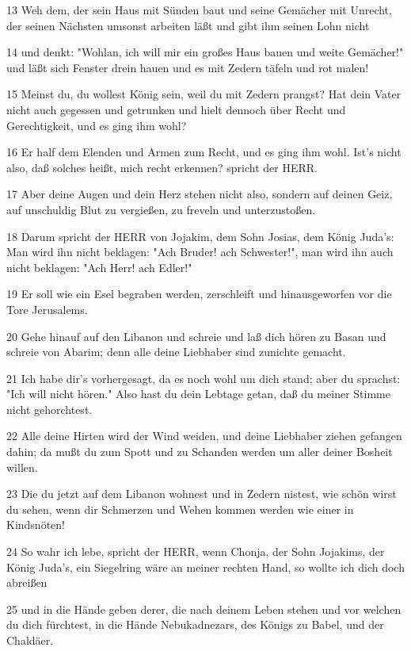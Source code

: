 \par 13 Weh dem, der sein Haus mit Sünden baut und seine Gemächer mit Unrecht, der seinen Nächsten umsonst arbeiten läßt und gibt ihm seinen Lohn nicht
\par 14 und denkt: "Wohlan, ich will mir ein großes Haus bauen und weite Gemächer!" und läßt sich Fenster drein hauen und es mit Zedern täfeln und rot malen!
\par 15 Meinst du, du wollest König sein, weil du mit Zedern prangst? Hat dein Vater nicht auch gegessen und getrunken und hielt dennoch über Recht und Gerechtigkeit, und es ging ihm wohl?
\par 16 Er half dem Elenden und Armen zum Recht, und es ging ihm wohl. Ist's nicht also, daß solches heißt, mich recht erkennen? spricht der HERR.
\par 17 Aber deine Augen und dein Herz stehen nicht also, sondern auf deinen Geiz, auf unschuldig Blut zu vergießen, zu freveln und unterzustoßen.
\par 18 Darum spricht der HERR von Jojakim, dem Sohn Josias, dem König Juda's: Man wird ihn nicht beklagen: "Ach Bruder! ach Schwester!", man wird ihn auch nicht beklagen: "Ach Herr! ach Edler!"
\par 19 Er soll wie ein Esel begraben werden, zerschleift und hinausgeworfen vor die Tore Jerusalems.
\par 20 Gehe hinauf auf den Libanon und schreie und laß dich hören zu Basan und schreie von Abarim; denn alle deine Liebhaber sind zunichte gemacht.
\par 21 Ich habe dir's vorhergesagt, da es noch wohl um dich stand; aber du sprachst: "Ich will nicht hören." Also hast du dein Lebtage getan, daß du meiner Stimme nicht gehorchtest.
\par 22 Alle deine Hirten wird der Wind weiden, und deine Liebhaber ziehen gefangen dahin; da mußt du zum Spott und zu Schanden werden um aller deiner Bosheit willen.
\par 23 Die du jetzt auf dem Libanon wohnest und in Zedern nistest, wie schön wirst du sehen, wenn dir Schmerzen und Wehen kommen werden wie einer in Kindsnöten!
\par 24 So wahr ich lebe, spricht der HERR, wenn Chonja, der Sohn Jojakims, der König Juda's, ein Siegelring wäre an meiner rechten Hand, so wollte ich dich doch abreißen
\par 25 und in die Hände geben derer, die nach deinem Leben stehen und vor welchen du dich fürchtest, in die Hände Nebukadnezars, des Königs zu Babel, und der Chaldäer.
